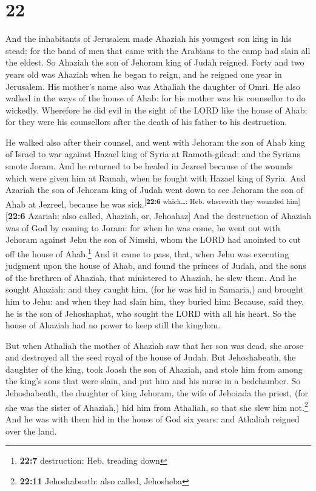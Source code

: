 \hypertarget{section-21}{%
\section{22}\label{section-21}}

 And the inhabitants of Jerusalem made Ahaziah his
youngest son king in his stead: for the band of men that came with the
Arabians to the camp had slain all the eldest. So Ahaziah the son of
Jehoram king of Judah reigned.  Forty and two years old
was Ahaziah when he began to reign, and he reigned one year in
Jerusalem. His mother's name also was Athaliah the daughter of Omri.
 He also walked in the ways of the house of Ahab: for his
mother was his counsellor to do wickedly.  Wherefore he
did evil in the sight of the LORD like the house of Ahab: for they were
his counsellors after the death of his father to his destruction.

 He walked also after their counsel, and went with Jehoram
the son of Ahab king of Israel to war against Hazael king of Syria at
Ramoth-gilead: and the Syrians smote Joram.  And he
returned to be healed in Jezreel because of the wounds which were given
him at Ramah, when he fought with Hazael king of Syria. And Azariah the
son of Jehoram king of Judah went down to see Jehoram the son of Ahab at
Jezreel, because he was sick.\textsuperscript{{[}\textbf{22:6}
which\ldots: Heb. wherewith they wounded him{]}}{[}\textbf{22:6}
Azariah: also called, Ahaziah, or, Jehoahaz{]}  And the
destruction of Ahaziah was of God by coming to Joram: for when he was
come, he went out with Jehoram against Jehu the son of Nimshi, whom the
LORD had anointed to cut off the house of Ahab.\footnote{\textbf{22:7}
  destruction: Heb. treading down}  And it came to pass,
that, when Jehu was executing judgment upon the house of Ahab, and found
the princes of Judah, and the sons of the brethren of Ahaziah, that
ministered to Ahaziah, he slew them.  And he sought
Ahaziah: and they caught him, (for he was hid in Samaria,) and brought
him to Jehu: and when they had slain him, they buried him: Because, said
they, he is the son of Jehoshaphat, who sought the LORD with all his
heart. So the house of Ahaziah had no power to keep still the kingdom.

 But when Athaliah the mother of Ahaziah saw that her son
was dead, she arose and destroyed all the seed royal of the house of
Judah.  But Jehoshabeath, the daughter of the king, took
Joash the son of Ahaziah, and stole him from among the king's sons that
were slain, and put him and his nurse in a bedchamber. So Jehoshabeath,
the daughter of king Jehoram, the wife of Jehoiada the priest, (for she
was the sister of Ahaziah,) hid him from Athaliah, so that she slew him
not.\footnote{\textbf{22:11} Jehoshabeath: also called, Jehosheba}
 And he was with them hid in the house of God six years:
and Athaliah reigned over the land.

